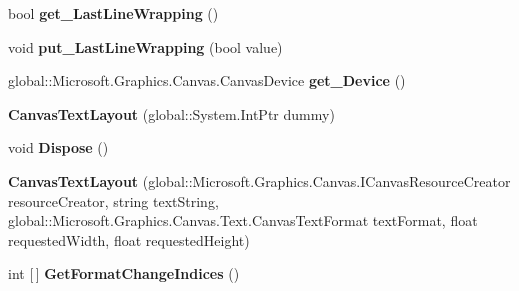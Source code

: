 \begin{DoxyCompactItemize}
\mbox{\label{class_microsoft_1_1_graphics_1_1_canvas_1_1_text_1_1_canvas_text_layout_aa574a94412591998ea88bcf6050fde56}} 
bool {\bfseries get\+\_\+\+Last\+Line\+Wrapping} ()
\item 
\mbox{\label{class_microsoft_1_1_graphics_1_1_canvas_1_1_text_1_1_canvas_text_layout_a23ffd7a9bc9689000496a12211b36095}} 
void {\bfseries put\+\_\+\+Last\+Line\+Wrapping} (bool value)
\item 
\mbox{\label{class_microsoft_1_1_graphics_1_1_canvas_1_1_text_1_1_canvas_text_layout_a63c18a3a380f4b86c17dc06ce7c426e1}} 
global\+::\+Microsoft.\+Graphics.\+Canvas.\+Canvas\+Device {\bfseries get\+\_\+\+Device} ()
\item 
\mbox{\label{class_microsoft_1_1_graphics_1_1_canvas_1_1_text_1_1_canvas_text_layout_aa0d12016b1d9631abf94ebe95eca05a0}} 
{\bfseries Canvas\+Text\+Layout} (global\+::\+System.\+Int\+Ptr dummy)
\item 
\mbox{\label{class_microsoft_1_1_graphics_1_1_canvas_1_1_text_1_1_canvas_text_layout_a7d35b539c782a63cef76d60d771100b9}} 
void {\bfseries Dispose} ()
\item 
\mbox{\label{class_microsoft_1_1_graphics_1_1_canvas_1_1_text_1_1_canvas_text_layout_a3e6e6ee905c4e104025e259714b4f387}} 
{\bfseries Canvas\+Text\+Layout} (global\+::\+Microsoft.\+Graphics.\+Canvas.\+I\+Canvas\+Resource\+Creator resource\+Creator, string text\+String, global\+::\+Microsoft.\+Graphics.\+Canvas.\+Text.\+Canvas\+Text\+Format text\+Format, float requested\+Width, float requested\+Height)
\item 
\mbox{\label{class_microsoft_1_1_graphics_1_1_canvas_1_1_text_1_1_canvas_text_layout_a3a21e6cfe852ee1c03c9ae0f65349cbe}} 
int \mbox{[}$\,$\mbox{]} {\bfseries Get\+Format\+Change\+Indices} ()

\end{DoxyCompactItemize}
